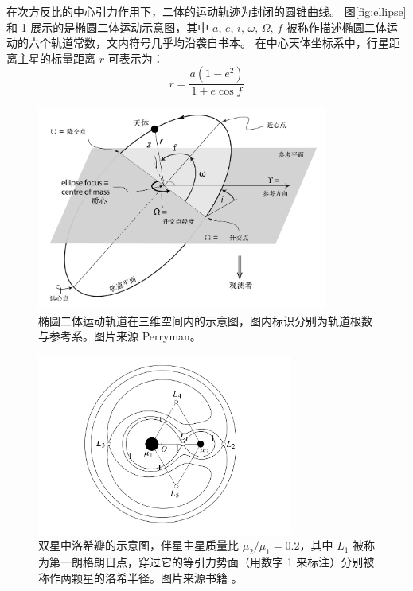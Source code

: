 在次方反比的中心引力作用下，二体的运动轨迹为封闭的圆锥曲线\cite{Newton1687}。
图\ref{fig:ellipse} 和 \ref{fig:3dorbit} 展示的是椭圆二体运动示意图，其中 $a,\,e,\,i,\,\omega,\,\Omega,\,f$ 
被称作描述椭圆二体运动的六个轨道常数，文内符号几乎均沿袭自书本。
在中心天体坐标系中，行星距离主星的标量距离 $r$ 可表示为：
\begin{equation} \label{radialdistance}
r = \frac{a(1-e^2)}{1+e\cos f}
\end{equation} %

\begin{figure}[t]
\centering
\includegraphics[width=0.85\textwidth]{figures/appendix/f2_3dorbit.pdf}
\caption{椭圆二体运动轨道在三维空间内的示意图，图内标识分别为轨道根数与参考系。图片来源 Perryman。}
\label{fig:3dorbit}
\end{figure}

\begin{figure}[hb!]
\centering
\includegraphics[width=0.75\textwidth]{figures/appendix/f3_rochelimit.pdf}
\caption[双星中洛希瓣的示意图，伴星主星质量比 $\mu_2/\mu_1 = 0.2$，其中 $L_1$ 被称为第一朗格朗日点，穿过它的等引力势面（用数字 1 来标注）分别被称作两颗星的洛希半径。图片版权 C. D. Murray，S. F. Dermott]{双星中洛希瓣的示意图，伴星主星质量比 $\mu_2/\mu_1 = 0.2$，其中 $L_1$ 被称为第一朗格朗日点，穿过它的等引力势面（用数字 1 来标注）分别被称作两颗星的洛希半径。图片来源书籍 。}
\label{fig:rocher}
\end{figure}

